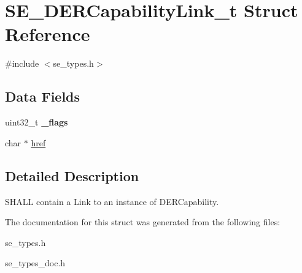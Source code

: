 \hypertarget{structSE__DERCapabilityLink__t}{}\section{S\+E\+\_\+\+D\+E\+R\+Capability\+Link\+\_\+t Struct Reference}
\label{structSE__DERCapabilityLink__t}


{\ttfamily \#include $<$se\+\_\+types.\+h$>$}

\subsection*{Data Fields}
\begin{DoxyCompactItemize}
\item 
uint32\+\_\+t {\bfseries \+\_\+flags}
\item 
char $\ast$ \hyperlink{group__DERCapabilityLink_ga70e58c8a8e494d1e297d78560d4c33e2}{href}
\end{DoxyCompactItemize}


\subsection{Detailed Description}
S\+H\+A\+LL contain a Link to an instance of D\+E\+R\+Capability. 

The documentation for this struct was generated from the following files\+:\begin{DoxyCompactItemize}
\item 
se\+\_\+types.\+h\item 
se\+\_\+types\+\_\+doc.\+h\end{DoxyCompactItemize}
